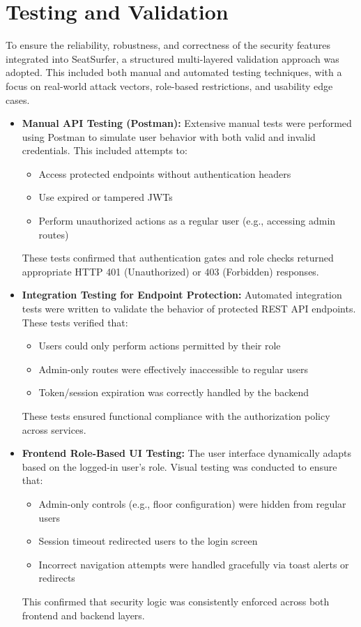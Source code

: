 \documentclass[12pt,a4paper]{report}
\begin{document}
\section{Testing and Validation}

To ensure the reliability, robustness, and correctness of the security features integrated into SeatSurfer, a structured multi-layered validation approach was adopted. This included both manual and automated testing techniques, with a focus on real-world attack vectors, role-based restrictions, and usability edge cases.

\begin{itemize}
\item \textbf{Manual API Testing (Postman):}
Extensive manual tests were performed using Postman to simulate user behavior with both valid and invalid credentials. This included attempts to:
\begin{itemize}
\item Access protected endpoints without authentication headers
\item Use expired or tampered JWTs
\item Perform unauthorized actions as a regular user (e.g., accessing admin routes)
\end{itemize}
These tests confirmed that authentication gates and role checks returned appropriate HTTP 401 (Unauthorized) or 403 (Forbidden) responses.
\item \textbf{Integration Testing for Endpoint Protection:}  
Automated integration tests were written to validate the behavior of protected REST API endpoints. These tests verified that:
\begin{itemize}
    \item Users could only perform actions permitted by their role
    \item Admin-only routes were effectively inaccessible to regular users
    \item Token/session expiration was correctly handled by the backend
\end{itemize}
These tests ensured functional compliance with the authorization policy across services.

\item \textbf{Frontend Role-Based UI Testing:}  
The user interface dynamically adapts based on the logged-in user's role. Visual testing was conducted to ensure that:
\begin{itemize}
    \item Admin-only controls (e.g., floor configuration) were hidden from regular users
    \item Session timeout redirected users to the login screen
    \item Incorrect navigation attempts were handled gracefully via toast alerts or redirects
\end{itemize}
This confirmed that security logic was consistently enforced across both frontend and backend layers.


\end{itemize}
\end{document}
